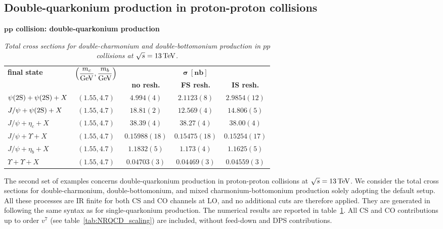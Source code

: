 \subsection{Double-quarkonium production in proton-proton collisions}
\begin{table}[t!]
\centering
\renewcommand*{\arraystretch}{1.4}
\textbf{$\boldsymbol{pp}$ collision: double-quarkonium production}
\begin{tabular}[t]{lcccc}
\toprule
\multirow{2}{*}{\textbf{final state}}  & \multirow{2}{*}{$\left(\dfrac{m_c}{\rm GeV}, \dfrac{m_b}{\rm GeV}\right)$} & \multicolumn{3}{c}{$\boldsymbol{\sigma}~[\textbf{nb}]$} \\
& & \textbf{no resh.} & \textbf{FS resh.} & \textbf{IS resh.} \\
\midrule
$\psi(2\mathrm{S}) + \psi(2\mathrm{S}) + X$ & $(1.55,4.7)$ & $4.994(4)$ & $2.1123(8)$ & $2.9854(12)$ \\ \hdashline
$J/\psi + \psi(2\mathrm{S}) + X$ & $(1.55,4.7)$ & $18.81(2)$ & $12.569(4)$ & $14.806(5)$ \\ \hdashline
$J/\psi + \eta_c + X$ & $(1.55,4.7)$ & $38.39(4)$ & $38.27(4)$ & $38.00(4)$ \\ \hdashline
$J/\psi + \Upsilon + X$ & $(1.55,4.7)$ & $0.15988(18)$ & $0.15475(18)$ & $0.15254(17)$ \\ \hdashline
$J/\psi + \eta_b + X$ & $(1.55,4.7)$ & $1.1832(5)$ & $1.173(4)$ & $1.1625(5)$ \\ \hdashline
$\Upsilon + \Upsilon + X$ & $(1.55,4.7)$ & $0.04703(3)$ & $0.04469(3)$ & $0.04559(3)$ \\
\bottomrule
\end{tabular}
\caption{\it\small Total cross sections for double-charmonium and double-bottomonium production in $p p$ collisions at $\sqrt{s} = 13\,{\rm TeV}$.}
\label{tab:sigma_pp2QQ}
\end{table}

The second set of examples concerns double-quarkonium production in proton-proton collisions at ${\sqrt{s}=13\,{\rm TeV}}$.
We consider the total cross sections for double-charmonium, double-bottomonium, and mixed charmonium-bottomonium production solely adopting the default setup. All these processes are IR finite for both CS and CO channels at LO, and no additional cuts are therefore applied.
They are generated in {\mgshort} following the same syntax as for single-quarkonium production. The numerical results are reported in table~\ref{tab:sigma_pp2QQ}. All CS and CO contributions up to order $v^7$ (see table~\ref{tab:NRQCD_scaling}) are included, without feed-down and DPS contributions.

